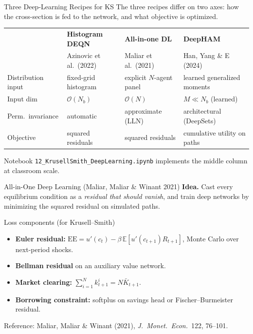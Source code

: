 \documentclass[aspectratio=169,11pt]{beamer}
\newcommand{\emphc}[1]{\textcolor{harvardcrimson}{#1}}
\newcommand{\E}[1]{\mathbb{E}\!\left[#1\right]}
\begin{document}
\begin{frame}{Three Deep-Learning Recipes for KS}
\small
The three recipes differ on two axes: how the cross-section is fed to the network, and what objective is optimized.

\vspace{0.3em}
\begin{center}
\scriptsize
\begin{tabular}{p{2.2cm} p{2.7cm} p{2.5cm} p{3.4cm}}
\toprule
 & \textbf{Histogram DEQN} & \textbf{All-in-one DL} & \textbf{DeepHAM} \\
 & Azinovic et al.\ (2022) & Maliar et al.\ (2021) & Han, Yang \& E (2024) \\
\midrule
Distribution input & fixed-grid histogram & explicit $N$-agent panel & learned generalized moments \\
\addlinespace
Input dim & $\mathcal{O}(N_b)$ & $\mathcal{O}(N)$ & $M \ll N_b$ (learned) \\
\addlinespace
Perm.\ invariance & automatic & approximate (LLN) & \emphc{architectural} (DeepSets) \\
\addlinespace
Objective & squared residuals & squared residuals & \emphc{cumulative utility} on paths \\
\bottomrule
\end{tabular}
\end{center}

\vspace{0.2em}
{\scriptsize Notebook \texttt{12\_KrusellSmith\_DeepLearning.ipynb} implements the middle column at classroom scale.}
\end{frame}

\begin{frame}{All-in-One Deep Learning (Maliar, Maliar \& Winant 2021)}
\small
\textbf{Idea.}  Cast every equilibrium condition as a \emph{residual that should vanish}, and train deep networks by minimizing the squared residual on simulated paths.

\vspace{0.4em}
\begin{block}{Loss components (for Krusell--Smith)}
\footnotesize
\begin{itemize}\itemsep1pt
    \item \textbf{Euler residual:} $\mathrm{EE} = u'(c_t) - \beta\,\E{u'(c_{t+1}) R_{t+1}}$, Monte Carlo over next-period shocks.
    \item \textbf{Bellman residual} on an auxiliary value network.
    \item \textbf{Market clearing:} $\sum_{i=1}^N k_{t+1}^i = N\bar K_{t+1}$.
    \item \textbf{Borrowing constraint:} softplus on savings head or Fischer--Burmeister residual.
\end{itemize}
\end{block}

\vspace{0.4em}
{\scriptsize Reference: Maliar, Maliar \& Winant (2021), \emph{J.\ Monet.\ Econ.}\ 122, 76--101.}
\end{frame}
\end{document}
